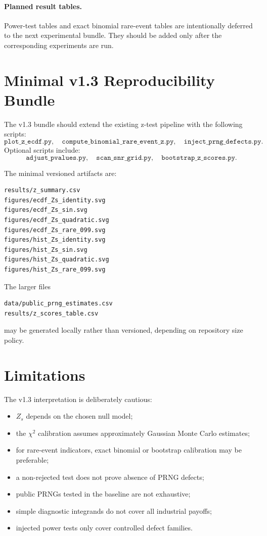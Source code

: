 \documentclass[11pt,a4paper]{article}
\begin{document}
\paragraph{Planned result tables.}
Power-test tables and exact binomial rare-event tables are intentionally deferred to the next experimental bundle. They should be added only after the corresponding experiments are run.

\section{Minimal v1.3 Reproducibility Bundle}

The v1.3 bundle should extend the existing z-test pipeline with the following scripts:
\[
\texttt{plot\_z\_ecdf.py},
\quad
\texttt{compute\_binomial\_rare\_event\_z.py},
\quad
\texttt{inject\_prng\_defects.py}.
\]
Optional scripts include:
\[
\texttt{adjust\_pvalues.py},
\quad
\texttt{scan\_snr\_grid.py},
\quad
\texttt{bootstrap\_z\_scores.py}.
\]

The minimal versioned artifacts are:
\begin{verbatim}
results/z_summary.csv
figures/ecdf_Zs_identity.svg
figures/ecdf_Zs_sin.svg
figures/ecdf_Zs_quadratic.svg
figures/ecdf_Zs_rare_099.svg
figures/hist_Zs_identity.svg
figures/hist_Zs_sin.svg
figures/hist_Zs_quadratic.svg
figures/hist_Zs_rare_099.svg
\end{verbatim}
The larger files
\begin{verbatim}
data/public_prng_estimates.csv
results/z_scores_table.csv
\end{verbatim}
may be generated locally rather than versioned, depending on repository size policy.

\section{Limitations}

The v1.3 interpretation is deliberately cautious:
\begin{itemize}
  \item $Z_s$ depends on the chosen null model;
  \item the $\chi^2$ calibration assumes approximately Gaussian Monte Carlo estimates;
  \item for rare-event indicators, exact binomial or bootstrap calibration may be preferable;
  \item a non-rejected test does not prove absence of PRNG defects;
  \item public PRNGs tested in the baseline are not exhaustive;
  \item simple diagnostic integrands do not cover all industrial payoffs;
  \item injected power tests only cover controlled defect families.
\end{itemize}
\end{document}
